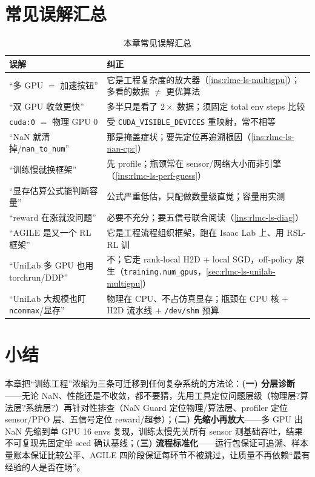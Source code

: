 \section{常见误解汇总}
\label{sec:rlmc-ls-misconceptions}

\begin{table}[H]\centering\small
\caption{本章常见误解汇总}
\label{tab:rlmc-ls-misconceptions}
\begin{tabular}{@{}p{5.4cm}p{6.4cm}@{}}
\toprule
误解 & 纠正 \\
\midrule
“多 GPU $=$ 加速按钮” & 它是工程复杂度的放大器（\cref{ins:rlmc-ls-multigpu}）；多看的数据 $\ne$ 更优算法 \\
“双 GPU 收敛更快” & 多半只是看了 $2\times$ 数据；须固定 total env steps 比较 \\
\verb|cuda:0| $=$ 物理 GPU 0 & 受 \verb|CUDA_VISIBLE_DEVICES| 重映射，常不相等 \\
“NaN 就清掉/\verb|nan_to_num|” & 那是掩盖症状；要先定位再追溯根因（\cref{ins:rlmc-ls-nan-cpr}） \\
“训练慢就换框架” & 先 profile；瓶颈常在 sensor/网络大小而非引擎（\cref{ins:rlmc-ls-perf-guess}） \\
“显存估算公式能判断容量” & 公式严重低估，只配做数量级直觉；容量用实测 \\
“reward 在涨就没问题” & 必要不充分；要五信号联合阅读（\cref{ins:rlmc-ls-diag}） \\
“AGILE 是又一个 RL 框架” & 它是工程流程组织框架，跑在 Isaac Lab 上、用 RSL-RL 训 \\
“UniLab 多 GPU 也用 torchrun/DDP” & 不；它走 rank-local H2D $+$ local SGD，off-policy 原生（\verb|training.num_gpus|，\cref{sec:rlmc-ls-unilab-multigpu}） \\
“UniLab 大规模也盯 \verb|nconmax|/显存” & 物理在 CPU、不占仿真显存；瓶颈在 CPU 核 $+$ H2D 流水线 $+$ \verb|/dev/shm| 预算 \\
\bottomrule
\end{tabular}
\end{table}

\section{小结}
\label{sec:rlmc-ls-summary}

本章把“训练工程”浓缩为三条可迁移到任何复杂系统的方法论：\textbf{(一) 分层诊断}——无论 NaN、性能还是不收敛，都不要猜，先用工具定位问题层级（物理层?算法层?系统层?）再针对性排查（NaN Guard 定位物理/算法层、profiler 定位 sensor/PPO 层、五信号定位 reward/超参）；\textbf{(二) 先缩小再放大}——多 GPU 出 NaN 先缩到单 GPU 16 envs 复现，训练太慢先关所有 sensor 测基础吞吐，结果不可复现先固定单 seed 确认基线；\textbf{(三) 流程标准化}——运行包保证可追溯、样本量账本保证比较公平、AGILE 四阶段保证每环节不被跳过，让质量不再依赖“最有经验的人是否在场”。

